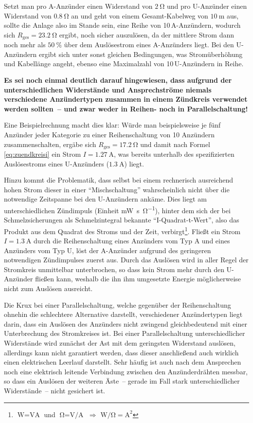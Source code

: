 \documentclass[paper=a4, parskip, numbers=noenddot, toc=listof, headsepline]{scrbook}
\begin{document}
				Setzt man pro A-Anzünder einen Widerstand von $\SI{2}{\ohm}$ und pro U-Anzünder einen Widerstand von $\SI{0,8}{\ohm}$ an und geht von einem Gesamt-Kabelweg von $\SI{10}{\metre}$ aus, sollte die Anlage also im Stande sein, eine Reihe von 10\,A-Anzündern, wodurch sich $R_\text{ges} = \SI{23,2}{\ohm}$ ergibt, noch sicher auszulösen, da der mittlere Strom dann noch mehr als $\SI{50}{\%}$ über dem Auslösestrom eines A-Anzünders liegt. Bei den U-Anzündern ergibt sich unter sonst gleichen Bedingungen, was Stromüberhöhung und Kabellänge angeht, ebenso eine Maximalzahl von 10\,U-Anzündern in Reihe.

				\textbf{Es sei noch einmal deutlich darauf hingewiesen, dass aufgrund der unterschiedlichen Widerstände und Ansprechströme niemals verschiedene Anzündertypen zusammen in einem Zündkreis verwendet werden sollten~-- und zwar weder in Reihen- noch in Parallelschaltung!}

				Eine Beispielrechnung macht dies klar: Würde man beispielsweise je fünf Anzünder jeder Kategorie zu einer Reihenschaltung von 10 Anzündern zusammenschalten, ergäbe sich $R_\text{ges} = \SI{17,2}{\ohm}$ und damit nach Formel \eqref{eq:zuendkreisi} ein Strom $I = \SI{1,27}{\ampere}$, was bereits unterhalb des spezifizierten Auslösestroms eines U-Anzünders ($\SI{1,3}{\ampere}$) liegt.

				Hinzu kommt die Problematik, dass selbst bei einem rechnerisch ausreichend hohen Strom dieser in einer \enquote{Mischschaltung} wahrscheinlich nicht über die notwendige Zeitspanne bei den U-Anzündern ankäme. Dies liegt am unterschiedlichen Zündimpuls (Einheit \si{\milli\watt\second\per\ohm}), hinter dem sich der bei Schmelzsicherungen als Schmelzintegral bekannte \enquote{I-Quadrat-t-Wert}, also das Produkt aus dem Quadrat des Stroms und der Zeit, verbirgt\footnote{$\si{\watt} = \si{\volt\ampere}$ und $\si{\ohm} = \si{\volt\per\ampere}$ $\Rightarrow$ $\si{\watt\per\ohm} = \si{\square\ampere}$}. Fließt ein Strom $I = \SI{1,3}{\ampere}$ durch die Reihenschaltung eines Anzünders vom Typ A und eines Anzünders vom Typ U, löst der A-Anzünder aufgrund des geringeren notwendigen Zündimpulses zuerst aus. Durch das Auslösen wird in aller Regel der Stromkreis unmittelbar unterbrochen, so dass kein Strom mehr durch den U-Anzünder fließen kann, weshalb die ihn ihm umgesetzte Energie möglicherweise nicht zum Auslösen ausreicht.

				Die Krux bei einer Parallelschaltung, welche gegenüber der Reihenschaltung ohnehin die schlechtere Alternative darstellt, verschiedener Anzündertypen liegt darin, dass ein Auslösen des Anzünders nicht zwingend gleichbedeutend mit einer Unterbrechung des Stromkreises ist. Bei einer Parallelschaltung unterschiedlicher Widerstände wird zunächst der Ast mit dem geringsten Widerstand auslösen, allerdings kann nicht garantiert werden, dass dieser anschließend auch wirklich einen elektrischen Leerlauf darstellt. Sehr häufig ist auch nach dem Ansprechen noch eine elektrisch leitende Verbindung zwischen den Anzünderdrähten messbar, so dass ein Auslösen der weiteren Äste~-- gerade im Fall stark unterschiedlicher Widerstände~-- nicht gesichert ist.
\end{document}
